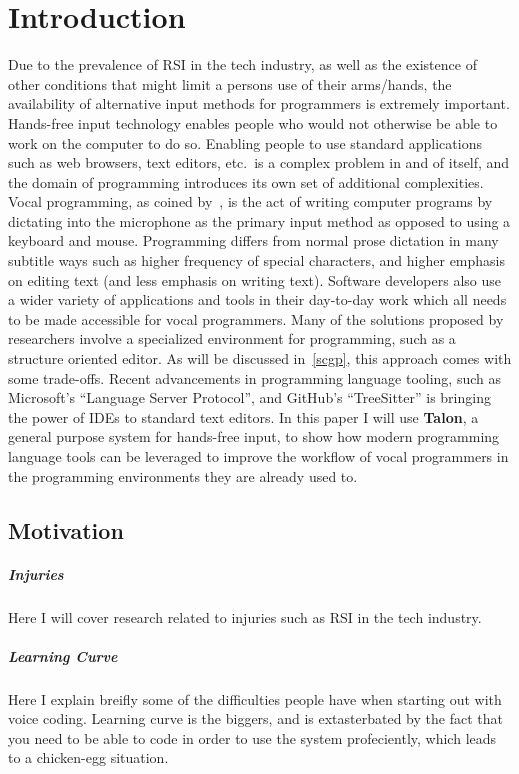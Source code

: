 \documentclass[../thesis.tex]{subfiles}
\begin{document}
\chapter{Introduction}
Due to the prevalence of RSI in the tech industry, as well as the existence of other conditions that might limit a persons use of their arms/hands, the availability
of alternative input methods for programmers is extremely important.
Hands-free input technology enables people who would not otherwise be able to work on the computer to do so.
Enabling people to use standard applications such as web browsers, text editors, etc.\ is a complex problem in and of itself, and the domain of programming
introduces its own set of additional complexities.
Vocal programming, as coined by~\parencite{Arnold}, is the act of writing computer programs by dictating into the microphone as the primary input method as opposed to using a keyboard and mouse.
Programming differs from normal prose dictation in many subtitle ways such as higher frequency of special characters, and higher emphasis on editing text (and less emphasis on writing text).
Software developers also use a wider variety of applications and tools in their day-to-day work which all needs to be made accessible for vocal programmers.
Many of the solutions proposed by researchers involve a specialized environment for programming, such as a structure oriented editor.
As will be discussed in~\ref{scgp}, this approach comes with some trade-offs.
Recent advancements in programming language tooling, such as Microsoft's ``Language Server Protocol'', and GitHub's ``TreeSitter'' is bringing the power of IDEs to standard text editors.
In this paper I will use \textbf{Talon}, a general purpose system for hands-free input, to show how modern programming language
   tools can be leveraged to improve the workflow of vocal programmers in the programming environments they are already used to.

\section{Motivation}
\paragraph{Injuries}
Here I will cover research related to injuries such as RSI in the tech industry.
\paragraph{Learning Curve}
Here I explain breifly some of the difficulties people have when starting out with voice coding.
Learning curve is the biggers, and is extasterbated by the fact that you need
to be able to code in order to use the system profeciently, which leads to a 
chicken-egg situation.
\end{document}
